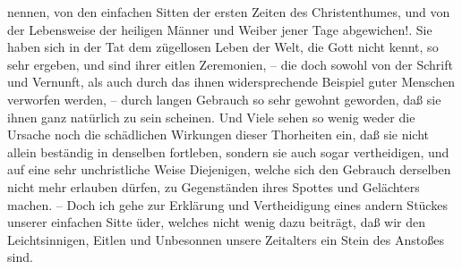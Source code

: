 nennen, von den einfachen Sitten der ersten Zeiten des Christenthumes, und von
der Lebensweise der heiligen Männer und Weiber jener Tage abgewichen!. Sie haben
sich in der Tat dem zügellosen Leben der Welt, die Gott nicht kennt, so sehr
ergeben, und sind ihrer eitlen Zeremonien, -- die doch sowohl von der Schrift
und Vernunft, als auch durch das ihnen widersprechende Beispiel guter Menschen
verworfen werden, -- durch langen Gebrauch so sehr gewohnt geworden, daß sie
ihnen ganz natürlich zu sein scheinen. Und Viele sehen so wenig weder die
Ursache noch die schädlichen Wirkungen dieser Thorheiten ein, daß sie nicht
allein beständig in denselben fortleben, sondern sie auch sogar vertheidigen,
und auf eine sehr unchristliche Weise Diejenigen, welche sich den Gebrauch
derselben nicht mehr erlauben dürfen, zu Gegenständen ihres Spottes und
Gelächters machen. -- Doch ich gehe zur Erklärung und Vertheidigung eines andern
Stückes unserer einfachen Sitte üder, welches nicht wenig dazu beiträgt, daß wir
den Leichtsinnigen, Eitlen und Unbesonnen unsere Zeitalters ein Stein des
Anstoßes sind.

